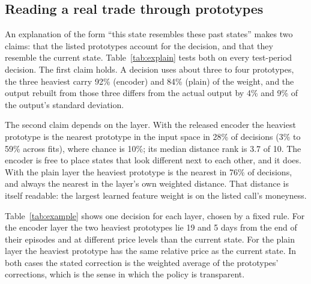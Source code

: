 \documentclass[10pt,conference]{IEEEtran}
\begin{document}
\subsection{Reading a real trade through prototypes}
\label{sec:explain}

\begin{table}[t]
\caption{Explanation diagnostics on all test-period decisions of the main
configuration ($K=10$; means over 100 fits per layer). Distances are
Euclidean in the standardised input space.}
\label{tab:explain}
\centering
\footnotesize

\end{table}

\begin{table}[t]
\caption{One test-period decision per layer (SPY, European call, seed 0): the
episode with the median hedging error, at the tenth of twenty decisions. Each
prototype is a state from a training episode, shown with that episode's start
date.}
\label{tab:example}
\centering
\scriptsize
\setlength{\tabcolsep}{2.5pt}

\end{table}

An explanation of the form ``this state resembles these past states'' makes
two claims: that the listed prototypes account for the decision, and that
they resemble the current state. Table~\ref{tab:explain} tests both on every
test-period decision. The first claim holds. A decision uses about three to
four prototypes, the three heaviest carry 92\% (encoder) and 84\% (plain) of
the weight, and the output rebuilt from those three differs from the actual
output by 4\% and 9\% of the output's standard deviation.

The second claim depends on the layer. With the released encoder the
heaviest prototype is the nearest prototype in the input space in 28\% of
decisions (3\% to 59\% across fits), where chance is 10\%; its median
distance rank is 3.7 of 10. The encoder is free to place states that look
different next to each other, and it does. With the plain layer the heaviest
prototype is the nearest in 76\% of decisions, and always the nearest in the
layer's own weighted distance. That distance is itself readable: the largest
learned feature weight is on the listed call's moneyness.

Table~\ref{tab:example} shows one decision for each layer, chosen by a fixed
rule. For the encoder layer the two heaviest prototypes lie 19 and 5 days
from the end of their episodes and at different price levels than the
current state. For the plain layer the heaviest prototype has the same
relative price as the current state. In both cases the stated correction is
the weighted average of the prototypes' corrections, which is the sense in
which the policy is transparent.
\end{document}
